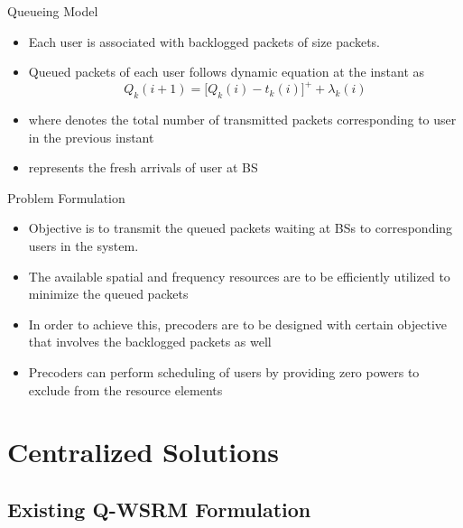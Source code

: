 \documentclass[10pt]{beamer}
\begin{document}
\begin{frame}{Queueing Model}
\begin{itemize}
\item Each user is associated with backlogged packets of size  packets.
\item Queued packets  of each user follows dynamic equation at the  instant as
\begin{equation}
Q_k(i+1) = \Big [ Q_k(i) - t_k(i) \Big ]^+ + \lambda_k(i)
\label{eqn-2a}
\end{equation}
\item where  denotes the total number of transmitted packets corresponding to user  in the previous  instant
\item {} represents the fresh arrivals of user  at \ac{BS} 
\end{itemize}
\end{frame}

\begin{frame}{Problem Formulation}
\begin{itemize}
\item Objective is to transmit the queued packets waiting at \acsp{BS} to corresponding users in the system.
\item The available spatial and frequency resources are to be efficiently utilized to minimize the queued packets
\item In order to achieve this, precoders are to be designed with certain objective that involves the backlogged packets as well
\item Precoders can perform scheduling of users by providing zero powers to exclude from the resource elements
\end{itemize}
\end{frame}

\section{Centralized Solutions}

\subsection{Existing \acs{Q-WSRM} Formulation}
\end{document}
